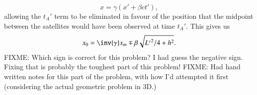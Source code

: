 {%
\begin{equation}\label{eqn:relElectroDynProblemSet1:1460}
x = \gamma ( x' + \beta c t'),
\end{equation}
%
allowing the \(t_A'\) term to be eliminated in favour of the position that the midpoint between the satellites would have been observed at time \(t_A'\).  This gives us
%
\begin{equation}\label{eqn:relElectroDynProblemSet1:1480}
x_0 = \inv{\gamma} x_m \mp \beta \sqrt{{L'}^2/4 + h^2}.
\end{equation}
%
FIXME: Which sign is correct for this problem?  I had guess the negative sign.  Fixing that is probably the toughest part of this problem!
%
%
FIXME: Had hand written notes for this part of the problem, with how I'd attempted it first (considering the actual geometric problem in 3D.)

} %

